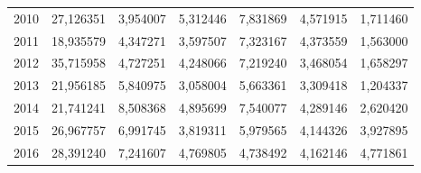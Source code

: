 \begin{table}
\begin{tabular}{p{1cm}p{2cm}p{2cm}p{2cm}p{2cm}p{2cm}p{2cm}}
 2010 &                        27,126351 &                                     3,954007 &  5,312446 &     7,831869 &                       4,571915 &                1,711460 \\
 2011 &                        18,935579 &                                     4,347271 &  3,597507 &     7,323167 &                       4,373559 &                1,563000 \\
 2012 &                        35,715958 &                                     4,727251 &  4,248066 &     7,219240 &                       3,468054 &                1,658297 \\
 2013 &                        21,956185 &                                     5,840975 &  3,058004 &     5,663361 &                       3,309418 &                1,204337 \\
 2014 &                        21,741241 &                                     8,508368 &  4,895699 &     7,540077 &                       4,289146 &                2,620420 \\
 2015 &                        26,967757 &                                     6,991745 &  3,819311 &     5,979565 &                       4,144326 &                3,927895 \\
 2016 &                        28,391240 &                                     7,241607 &  4,769805 &     4,738492 &                       4,162146 &                4,771861 \\
\bottomrule
\end{tabular}
\end{table}
